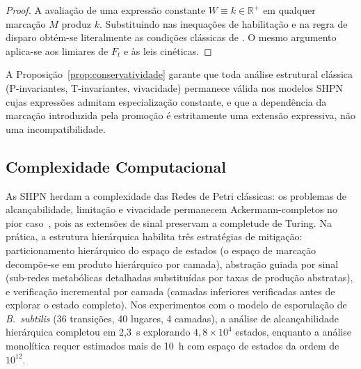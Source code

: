 \begin{proof}
A avaliação de uma expressão constante $W \equiv k \in \mathbb{R}^+$ em
qualquer marcação $M$ produz $k$. Substituindo nas inequações de
habilitação e na regra de disparo obtém-se literalmente as condições
clássicas de \textcite{David1992}. O mesmo argumento aplica-se aos
limiares de $F_t$ e às leis cinéticas. \qedhere
\end{proof}

A Proposição~\ref{prop:conservatividade} garante que toda análise
estrutural clássica (P-invariantes, T-invariantes, vivacidade) permanece
válida nos modelos SHPN cujas expressões admitam especialização constante,
e que a dependência da marcação introduzida pela promoção é estritamente
uma extensão expressiva, não uma incompatibilidade.

\subsection{Complexidade Computacional}
\label{subsec:complexidade}

As SHPN herdam a complexidade das Redes de Petri clássicas: os problemas de
alcançabilidade, limitação e vivacidade permanecem Ackermann-completos no pior
caso~\cite{Czerwinski2021}, pois as extensões de sinal preservam a completude de Turing. Na prática,
a estrutura hierárquica habilita três estratégias de mitigação: particionamento
hierárquico do espaço de estados (o espaço de marcação decompõe-se em produto
hierárquico por camada), abstração guiada por sinal (sub-redes metabólicas
detalhadas substituídas por taxas de produção abstratas), e verificação incremental
por camada (camadas inferiores verificadas antes de explorar o estado completo).
Nos experimentos com o modelo de esporulação de \textit{B.~subtilis} (36
transições, 40 lugares, 4 camadas), a análise de alcançabilidade hierárquica
completou em 2,3~s explorando $4{,}8 \times 10^4$ estados, enquanto a análise
monolítica requer estimados mais de 10~h com espaço de estados da ordem de
$10^{12}$.

